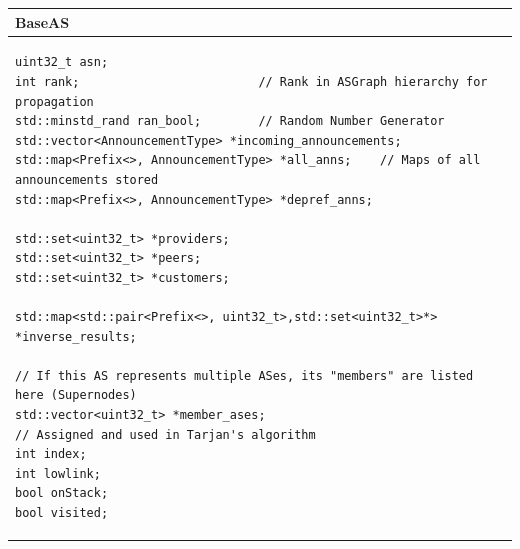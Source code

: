 \documentclass[letterpaper]{article}
\begin{document}
\begin{longtable}[]{@{}l@{}}
\toprule
\textbf{BaseAS}\tabularnewline
\midrule
\endhead
\begin{minipage}[t]{0.97\columnwidth}\raggedright
\begin{verbatim}
uint32_t asn;     
int rank;                         // Rank in ASGraph hierarchy for propagation 
std::minstd_rand ran_bool;        // Random Number Generator
std::vector<AnnouncementType> *incoming_announcements;
std::map<Prefix<>, AnnouncementType> *all_anns;    // Maps of all announcements stored
std::map<Prefix<>, AnnouncementType> *depref_anns;

std::set<uint32_t> *providers; 
std::set<uint32_t> *peers; 
std::set<uint32_t> *customers; 

std::map<std::pair<Prefix<>, uint32_t>,std::set<uint32_t>*> *inverse_results; 

// If this AS represents multiple ASes, its "members" are listed here (Supernodes)  
std::vector<uint32_t> *member_ases;
// Assigned and used in Tarjan's algorithm
int index;
int lowlink;
bool onStack;
bool visited;      
\end{verbatim}
\strut
\end{minipage}\tabularnewline
\bottomrule
\end{longtable}
\end{document}
